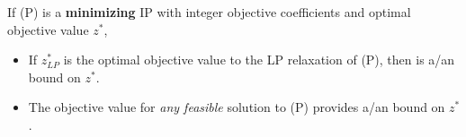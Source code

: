 \documentclass[11pt]{article}
\theoremstyle{definition}
\newcommand{\answerbox}[3]{%
  \fbox{%
    \begin{minipage}[#1]{#2}
      \hfill\vspace{#3}
    \end{minipage}
  }
}
\newcommand{\answerboxfull}[2]{%
  \answerbox{#1}{6.38in}{#2} 
}
\newcommand{\wordbox}{\answerbox{c}{1.2in}{.7cm}}
\newcommand{\catbox}{\answerbox{c}{.5in}{.7cm}}
\begin{document}
\begin{tcolorbox}
If (P) is a \textbf{minimizing} IP with integer objective coefficients and optimal objective value $z^*$,
\begin{itemize}
\item  If $z^*_{LP}$ is the optimal objective value to the LP relaxation of (P), then \catbox is a/an \wordbox bound on $z^*$.
\item  The objective value for \emph{any feasible} solution to (P) provides a/an \wordbox bound on $z^*$.
\end{itemize}
\end{tcolorbox}















\end{document}

